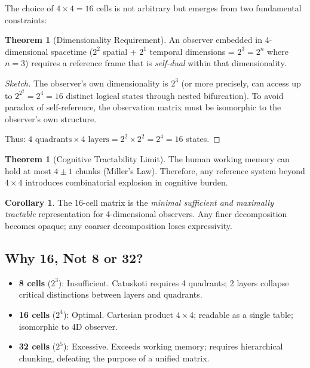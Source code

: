 \documentclass[12pt,a4paper]{article}
\theoremstyle{definition}
\newtheorem{theorem}[definition]{Theorem}
\newtheorem{corollary}[definition]{Corollary}
\begin{document}
The choice of $4 \times 4 = 16$ cells is not arbitrary but emerges from two fundamental constraints:

\begin{theorem}[Dimensionality Requirement]
An observer embedded in 4-dimensional spacetime ($2^2$ spatial + $2^1$ temporal dimensions = $2^3 = 2^n$ where $n=3$) requires a reference frame that is \textit{self-dual} within that dimensionality.
\end{theorem}

\begin{proof}[Sketch]
The observer's own dimensionality is $2^3$ (or more precisely, can access up to $2^{2^2} = 2^4 = 16$ distinct logical states through nested bifurcation). To avoid paradox of self-reference, the observation matrix must be isomorphic to the observer's own structure.

Thus: $4 \text{ quadrants} \times 4 \text{ layers} = 2^2 \times 2^2 = 2^4 = 16$ states.
\end{proof}

\begin{theorem}[Cognitive Tractability Limit]
The human working memory can hold at most $4 \pm 1$ chunks (Miller's Law). Therefore, any reference system beyond $4 \times 4$ introduces combinatorial explosion in cognitive burden.
\end{theorem}

\begin{corollary}
The 16-cell matrix is the \textit{minimal sufficient and maximally tractable} representation for 4-dimensional observers. Any finer decomposition becomes opaque; any coarser decomposition loses expressivity.
\end{corollary}

\subsection{Why 16, Not 8 or 32?}

\begin{itemize}
    \item \textbf{8 cells} ($2^3$): Insufficient. Catuskoti requires 4 quadrants; 2 layers collapse critical distinctions between layers and quadrants.
    \item \textbf{16 cells} ($2^4$): Optimal. Cartesian product $4 \times 4$; readable as a single table; isomorphic to 4D observer.
    \item \textbf{32 cells} ($2^5$): Excessive. Exceeds working memory; requires hierarchical chunking, defeating the purpose of a unified matrix.
\end{itemize}
\end{document}
